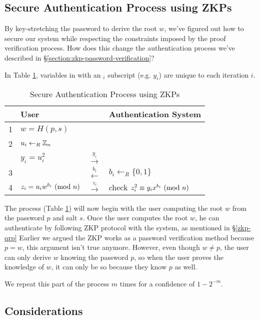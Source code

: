\subsection{Secure Authentication Process using ZKPs}
By key-stretching the password to derive the root $w$, we've figured out how to secure our system while respecting the constraints imposed by the proof verification process.
How does this change the authentication process we've described in \S\ref{section:zkp-password-verification}?

\bigskip
\noindent
In Table \ref{table:sap-zkp}, variables in with an $_i$ subscript (e.g. $y_i$) are unique to each iteration $i$.

\begin{table}[h!]
	\centering
		\caption{Secure Authentication Process using ZKPs}
		\vspace{0.1cm}
	\begin{tabular}{p{}|p{}|p{}|p{}}
  		& User & & Authentication System\\
  		\hline
		1 & $w = H(p, s)$ & & \\ 
		\hline
		2 & $u_i \leftarrow_R \Bbb{Z}_{n}$ &  \\
		& $y_i = u_i^2$ & $\xrightarrow{y_i}$ \\
		3 & & $\xleftarrow{b_i}$ & $b_i \leftarrow_R \{0, 1\} $ \\
		4 & $z_i = u_iw^{b_i} \ (\mathrm{mod}\ n) $ & $\xrightarrow{z_i}$ & check $z_i^2 \equiv y_ix^{b_i} \ (\mathrm{mod}\ n)$\\ 
	\end{tabular}
	\label{table:sap-zkp}
\end{table}

\bigskip
\noindent
The process (Table \ref{table:sap-zkp}) will now begin with the user computing the root $w$ from the password $p$ and salt $s$.
Once the user computes the root $w$, he can authenticate by following ZKP protocol with the system, as mentioned in \S\ref{zkp-qrp}
Earlier we argued the ZKP works as a password verification method because $p = w$, this argument isn't true anymore.
However, even though $w \not = p$, the user can only derive $w$ knowing the password $p$, so when the user proves the knowledge of $w$, it can only be so because they know $p$ as well.

\noindent
We repeat this part of the process $m$ times for a confidence of $1 - 2^{-m}$.
 
\subsection{Considerations}
\label{section:pefromance-considerations}
